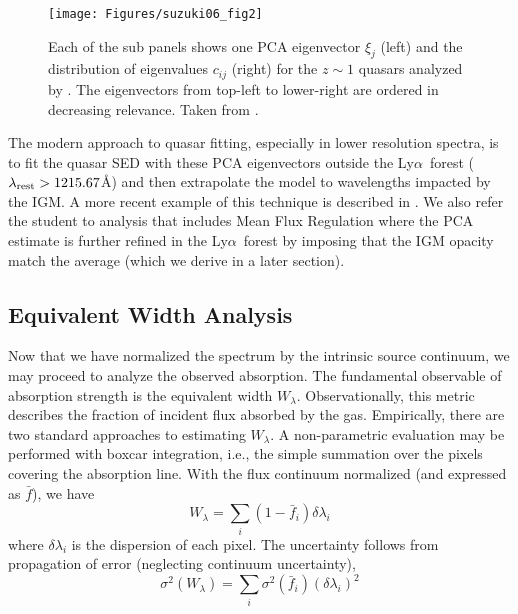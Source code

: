 \documentclass[graybox]{svmult}
\def\lya{Ly$\alpha$}
\def\smm{\sum\limits}
\begin{document}
%
\begin{figure}[b]
\sidecaption
\texttt{[image: Figures/suzuki06\_fig2]}
%
%
\caption{Each of the sub panels shows one PCA eigenvector 
$\xi_j$  (left) 
and the distribution of eigenvalues $c_{ij}$ (right) for the 
$z\sim 1$ quasars analyzed by \cite{suzuki06}.
The eigenvectors from top-left to lower-right are ordered
in decreasing relevance.
Taken from \cite{suzuki06}.
}
\label{fig:PCA}       %
\end{figure}

The modern approach to quasar fitting, especially in 
lower resolution spectra, is to fit the quasar SED
with these PCA eigenvectors outside the \lya\ forest
($\lambda_{\rm rest} > 1215.67$\AA) and then extrapolate
the model to wavelengths impacted by the IGM.
A more recent example of this technique is described
in \cite{paris11}.  We also refer the student to analysis
that includes Mean Flux Regulation \cite{lee11} where the
PCA estimate is further refined in the \lya\ forest by
imposing that the IGM opacity match the average (which
we derive in a later section).

\subsection{Equivalent Width Analysis}

Now that we have normalized the spectrum by the
intrinsic source continuum, we may proceed to analyze
the observed absorption.  The fundamental observable
of absorption strength is the equivalent width $W_\lambda$.
Observationally, this metric describes the fraction of
incident flux absorbed by the gas.  Empirically, there
are two standard approaches to estimating $W_\lambda$.
A non-parametric evaluation may be performed with
boxcar integration, i.e.,
the simple summation over the pixels covering the absorption line.
With the flux continuum normalized  (and expressed as $\bar f$),
we have
\begin{equation}
W_\lambda = \smm_i (1- \bar f_i) \delta\lambda_i
\label{eqn:EWtwo}
\end{equation}
where $\delta\lambda_i$ is the dispersion of each pixel.
The uncertainty follows from propagation of error (neglecting
continuum uncertainty),
\begin{equation}
\sigma^2(W_\lambda) = \smm_i \sigma^2(\bar f_i) (\delta\lambda_i)^2
\label{eqn:sigEW}
\end{equation}
\end{document}
